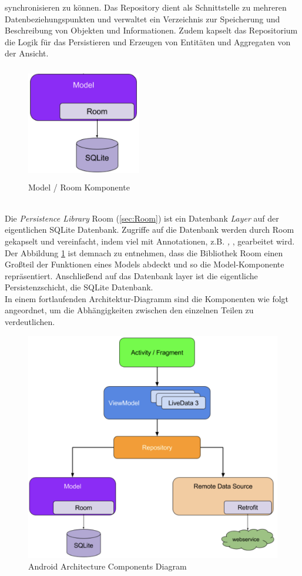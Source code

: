 synchronisieren zu können. Das Repository dient als Schnittstelle zu mehreren Datenbeziehungspunkten und verwaltet ein Verzeichnis zur 
Speicherung und Beschreibung von Objekten und Informationen. Zudem kapselt das Repositorium die Logik für das Persistieren und Erzeugen von 
Entitäten und Aggregaten von der Ansicht. 
\begin{figure}[hbt!]
    \centering
    \includegraphics[width=5cm,height=5cm,keepaspectratio]{2GrundlagenX/Bilder/roomComp.png}
    \caption{Model / Room Komponente \cite{aac.2020j}}
    \label{pic:roomComp}
\end{figure} 
\\ 
\linebreak
Die \textit{Persistence Library} Room (\ref{sec:Room}) ist ein Datenbank \textit{Layer} auf der eigentlichen SQLite Datenbank. Zugriffe auf 
die Datenbank werden durch Room gekapselt und vereinfacht, indem viel mit Annotationen, z.B. \textit{\@Entity, \@Dao}, gearbeitet wird. Der 
Abbildung \ref{pic:roomComp} ist demnach zu entnehmen, dass die Bibliothek Room einen Großteil der Funktionen eines Models abdeckt und so 
die Model-Komponente repräsentiert. Anschließend auf das Datenbank layer ist die eigentliche Persistenzschicht, die SQLite Datenbank.
\\ 
\linebreak 
In einem fortlaufenden Architektur-Diagramm sind die Komponenten wie folgt angeordnet, um die Abhängigkeiten zwischen den einzelnen Teilen 
zu verdeutlichen. 
\begin{figure}[hbt!]
    \centering
    \includegraphics[width=15cm,height=10cm,keepaspectratio]{2GrundlagenX/Bilder/aac.png}
    \caption{Android Architecture Components Diagram\cite{aac.2020j}}
    \label{pic:aacDia}
\end{figure} 
